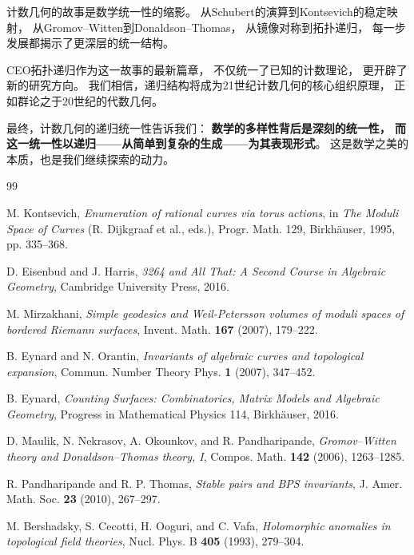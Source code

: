 \documentclass[11pt,a4paper]{article}
\theoremstyle{plain}
\theoremstyle{definition}
\begin{document}
计数几何的故事是数学统一性的缩影。
从Schubert的演算到Kontsevich的稳定映射，
从Gromov--Witten到Donaldson--Thomas，
从镜像对称到拓扑递归，
每一步发展都揭示了更深层的统一结构。

CEO拓扑递归作为这一故事的最新篇章，
不仅统一了已知的计数理论，
更开辟了新的研究方向。
我们相信，递归结构将成为21世纪计数几何的核心组织原理，
正如群论之于20世纪的代数几何。

最终，计数几何的递归统一性告诉我们：
\textbf{数学的多样性背后是深刻的统一性，
而这一统一性以递归——从简单到复杂的生成——为其表现形式}。
这是数学之美的本质，也是我们继续探索的动力。


\begin{thebibliography}{99}

 M. Kontsevich,
\textit{Enumeration of rational curves via torus actions},
in \emph{The Moduli Space of Curves} (R. Dijkgraaf et al., eds.),
Progr. Math. 129, Birkhäuser, 1995, pp. 335--368.

 D. Eisenbud and J. Harris,
\textit{3264 and All That: A Second Course in Algebraic Geometry},
Cambridge University Press, 2016.

 M. Mirzakhani,
\textit{Simple geodesics and Weil-Petersson volumes of moduli spaces of bordered Riemann surfaces},
Invent. Math. \textbf{167} (2007), 179--222.

 B. Eynard and N. Orantin,
\textit{Invariants of algebraic curves and topological expansion},
Commun. Number Theory Phys. \textbf{1} (2007), 347--452.

 B. Eynard,
\textit{Counting Surfaces: Combinatorics, Matrix Models and Algebraic Geometry},
Progress in Mathematical Physics 114, Birkhäuser, 2016.

 D. Maulik, N. Nekrasov, A. Okounkov, and R. Pandharipande,
\textit{Gromov--Witten theory and Donaldson--Thomas theory, I},
Compos. Math. \textbf{142} (2006), 1263--1285.

 R. Pandharipande and R. P. Thomas,
\textit{Stable pairs and BPS invariants},
J. Amer. Math. Soc. \textbf{23} (2010), 267--297.

 M. Bershadsky, S. Cecotti, H. Ooguri, and C. Vafa,
\textit{Holomorphic anomalies in topological field theories},
Nucl. Phys. B \textbf{405} (1993), 279--304.


\end{thebibliography}
\end{document}
